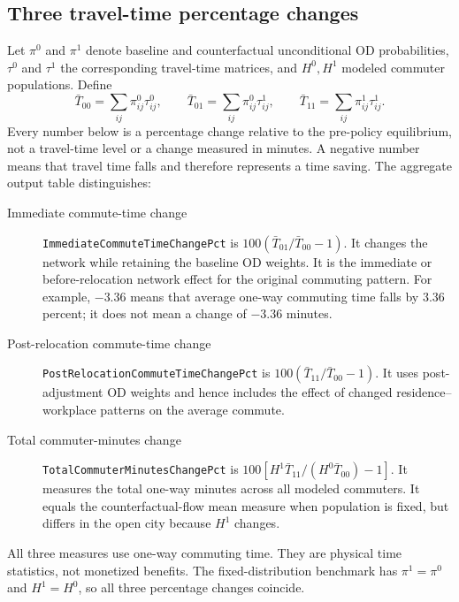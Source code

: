 \documentclass[11pt,a4paper]{article}
\begin{document}
\subsection{Three travel-time percentage changes}
Let $\pi^0$ and $\pi^1$ denote baseline and counterfactual unconditional OD
probabilities, $\tau^0$ and $\tau^1$ the corresponding travel-time matrices,
and $H^0,H^1$ modeled commuter populations. Define
\begin{equation}
 \bar T_{00}=\sum_{ij}\pi_{ij}^0\tau_{ij}^0,\qquad
 \bar T_{01}=\sum_{ij}\pi_{ij}^0\tau_{ij}^1,\qquad
 \bar T_{11}=\sum_{ij}\pi_{ij}^1\tau_{ij}^1.          \label{eq:traveltimemeans}
\end{equation}
Every number below is a percentage change relative to the pre-policy
equilibrium, not a travel-time level or a change measured in minutes. A negative
number means that travel time falls and therefore represents a time saving. The
aggregate output table distinguishes:
\begin{description}
\item[Immediate commute-time change]
\par\noindent
\texttt{ImmediateCommuteTime}\newline\texttt{ChangePct} is
$100(\bar T_{01}/\bar T_{00}-1)$. It changes the network while retaining the
baseline OD weights. It is the immediate or before-relocation network effect
for the original commuting pattern. For example, $-3.36$ means that average
one-way commuting time falls by $3.36$ percent; it does not mean a change of
$-3.36$ minutes.
\item[Post-relocation commute-time change]
\par\noindent
\texttt{PostRelocationCommuteTime}\newline\texttt{ChangePct} is
$100(\bar T_{11}/\bar T_{00}-1)$. It uses post-adjustment OD weights and hence
includes the effect of changed residence--workplace patterns on the average
commute.
\item[Total commuter-minutes change]
\par\noindent
\texttt{TotalCommuterMinutes}\newline\texttt{ChangePct} is
$100[H^1\bar T_{11}/(H^0\bar T_{00})-1]$. It measures the total one-way minutes
across all modeled commuters. It equals the counterfactual-flow mean measure
when population is fixed, but differs in the open city because $H^1$ changes.
\end{description}
All three measures use one-way commuting time. They are physical time
statistics, not monetized benefits. The fixed-distribution benchmark has
$\pi^1=\pi^0$ and $H^1=H^0$, so all three percentage changes coincide.
\end{document}
